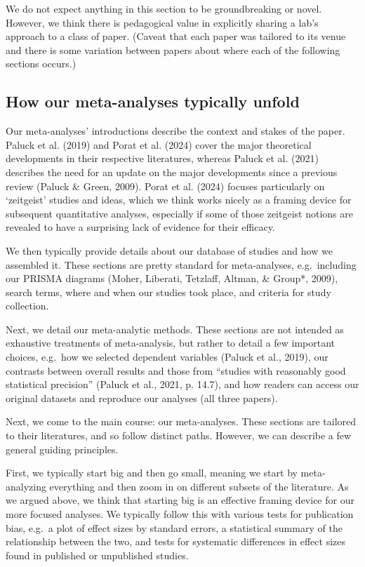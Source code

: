 \documentclass[
  ,jou]{apa6}
\begin{document}
We do not expect anything in this section to be groundbreaking or novel. However, we think there is pedagogical value in explicitly sharing a lab's approach to a class of paper. (Caveat that each paper was tailored to its venue and there is some variation between papers about where each of the following sections occurs.)

\subsection{How our meta-analyses typically unfold}\label{how-our-meta-analyses-typically-unfold}

Our meta-analyses' introductions describe the context and stakes of the paper. Paluck et al. (2019) and Porat et al. (2024) cover the major theoretical developments in their respective literatures, whereas Paluck et al. (2021) describes the need for an update on the major developments since a previous review (Paluck \& Green, 2009). Porat et al. (2024) focuses particularly on `zeitgeist' studies and ideas, which we think works nicely as a framing device for subsequent quantitative analyses, especially if some of those zeitgeist notions are revealed to have a surprising lack of evidence for their efficacy.

We then typically provide details about our database of studies and how we assembled it. These sections are pretty standard for meta-analyses, e.g.~including our PRISMA diagrams (Moher, Liberati, Tetzlaff, Altman, \& Group*, 2009), search terms, where and when our studies took place, and criteria for study collection.

Next, we detail our meta-analytic methods. These sections are not intended as exhaustive treatments of meta-analysis, but rather to detail a few important choices, e.g.~how we selected dependent variables (Paluck et al., 2019), our contrasts between overall results and those from ``studies with reasonably good statistical precision'' (Paluck et al., 2021, p. 14.7), and how readers can access our original datasets and reproduce our analyses (all three papers).

Next, we come to the main course: our meta-analyses. These sections are tailored to their literatures, and so follow distinct paths. However, we can describe a few general guiding principles.

First, we typically start big and then go small, meaning we start by meta-analyzing everything and then zoom in on different subsets of the literature. As we argued above, we think that starting big is an effective framing device for our more focused analyses. We typically follow this with various tests for publication bias, e.g.~a plot of effect sizes by standard errors, a statistical summary of the relationship between the two, and tests for systematic differences in effect sizes found in published or unpublished studies.
\end{document}
